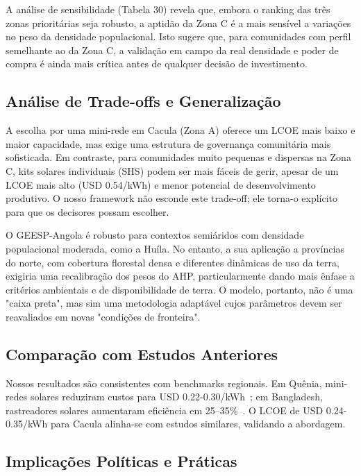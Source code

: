 \documentclass[12pt, a4paper]{article}
\begin{document}
A análise de sensibilidade (Tabela 30) revela que, embora o ranking das três zonas prioritárias seja robusto, a aptidão da Zona C é a mais sensível a variações no peso da densidade populacional. Isto sugere que, para comunidades com perfil semelhante ao da Zona C, a validação em campo da real densidade e poder de compra é ainda mais crítica antes de qualquer decisão de investimento.

\subsection{Análise de Trade-offs e Generalização}

A escolha por uma mini-rede em Cacula (Zona A) oferece um LCOE mais baixo e maior capacidade, mas exige uma estrutura de governança comunitária mais sofisticada. Em contraste, para comunidades muito pequenas e dispersas na Zona C, kits solares individuais (SHS) podem ser mais fáceis de gerir, apesar de um LCOE mais alto (USD 0.54/kWh) e menor potencial de desenvolvimento produtivo. O nosso framework não esconde este trade-off; ele torna-o explícito para que os decisores possam escolher.

O GEESP-Angola é robusto para contextos semiáridos com densidade populacional moderada, como a Huíla. No entanto, a sua aplicação a províncias do norte, com cobertura florestal densa e diferentes dinâmicas de uso da terra, exigiria uma recalibração dos pesos do AHP, particularmente dando mais ênfase a critérios ambientais e de disponibilidade de terra. O modelo, portanto, não é uma "caixa preta", mas sim uma metodologia adaptável cujos parâmetros devem ser reavaliados em novas "condições de fronteira".

\subsection{Comparação com Estudos Anteriores}

Nossos resultados são consistentes com benchmarks regionais. Em Quênia, mini-redes solares reduziram custos para USD 0.22-0.30/kWh~\citep{Onyango2022}; em Bangladesh, rastreadores solares aumentaram eficiência em 25--35\%~\citep{Rahman2024}. O LCOE de USD 0.24-0.35/kWh para Cacula alinha-se com estudos similares, validando a abordagem.

\subsection{Implicações Políticas e Práticas}
\end{document}
